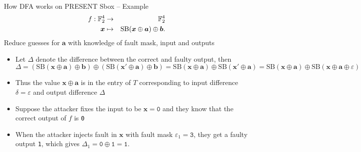 \begin{frame}{How DFA works on PRESENT Sbox -- Example}
\begin{eqnarray*}
    f:{\mathbb F}_2^4&\to&{\mathbb F}_2^4\\
    \boldsymbol{x}&\mapsto& \text{SB}(\boldsymbol{x}\oplus\boldsymbol{a})\oplus\boldsymbol{b}.\nonumber
\end{eqnarray*}
Reduce guesses for $\boldsymbol{a}$ with knowledge of fault mask, input and outputs
    \begin{itemize}
         \item Let $\Delta$ denote the difference between the correct and faulty output, then
{\small
\begin{equation*}
    \Delta=(\text{SB}(\boldsymbol{x}\oplus\boldsymbol{a})\oplus\boldsymbol{b})\oplus(\text{SB}(\boldsymbol{x}'\oplus\boldsymbol{a})\oplus\boldsymbol{b})
    =\text{SB}(\boldsymbol{x}\oplus\boldsymbol{a})\oplus\text{SB}(\boldsymbol{x}'\oplus\boldsymbol{a})=\text{SB}(\boldsymbol{x}\oplus\boldsymbol{a})\oplus\text{SB}(\boldsymbol{x}\oplus\boldsymbol{a}\oplus\varepsilon)
\end{equation*}}
\item Thus the value $\boldsymbol{x}\oplus\boldsymbol{a}$ is in the entry of $T$ corresponding to input difference $\delta=\varepsilon$ and output difference $\Delta$
    \end{itemize}
    \begin{example}
        \begin{itemize}
           \item Suppose the attacker fixes the input to be $\boldsymbol{x}=\texttt{0}$ and they know that the correct output of $f$ is \texttt{0}
            \item When the attacker injects fault in $\boldsymbol{x}$ with fault mask $\varepsilon_1=\texttt{3}$, they get a faulty output \texttt{1}, which gives             
            $\Delta_1=\texttt{0}\oplus\texttt{1}=\texttt{1}$.
        \end{itemize}
    \end{example}
\end{frame}

